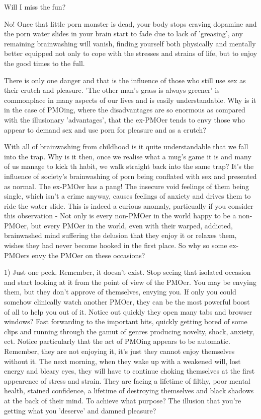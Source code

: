 Will I miss the fun?

No! Once that little porn monster is dead, your body stops craving dopamine and the porn water slides in your brain start to fade due to lack of 'greasing', any remaining brainwashing will vanish, finding yourself both physically and mentally better equipped not only to cope with the stresses and strains of life, but to enjoy the good times to the full.

There is only one danger and that is the influence of those who still use sex as their crutch and pleasure. 'The other man's grass is always greener' is commonplace in many aspects of our lives and is easily understandable. Why is it in the case of PMOing, where the disadvantages are so enormous as compared with the illusionary 'advantages', that the ex-PMOer tends to envy those who appear to demand sex and use porn for pleasure and as a crutch?

With all of brainwashing from childhood is it quite understandable that we fall into the trap. Why is it then, once we realise what a mug's game it is and many of us manage to kick th habit, we walk straight back into the same trap? It's the influence of society's brainwashing of porn being conflated with sex and presented as normal. The ex-PMOer has a pang! The insecure void feelings of them being single, which isn't a crime anyway, causes feelings of anxiety and drives them to ride the water slide. This is indeed a curious anomaly, particually if you consider this observation - Not only is every non-PMOer in the world happy to be a non-PMOer, but every PMOer in the world, even with their warped, addicted, brainwashed mind suffering the delusion that they enjoy it or relaxes them, wishes they had never become hooked in the first place. So why so some ex-PMOers envy the PMOer on these occasions?

  1) Just one peek. Remember, it doesn't exist. Stop seeing that isolated occasion and start looking at it from the point of view of the PMOer. You may be envying them, but they don't approve of themselves, envying you. If only you could somehow clinically watch another PMOer, they can be the most powerful boost of all to help you out of it. Notice out quickly they open many tabs and browser windows? Fast forwarding to the important bits, quickly getting bored of some clips and running through the gamut of genres producing novelty, shock, anxiety, ect. Notice particularly that the act of PMOing appears to be automatic. Remember, they are not enjoying it, it's just they cannot enjoy themselves without it. The next morning, when they wake up with a weakened will, lost energy and bleary eyes, they will have to continue choking themselves at the first appearence of stress and strain. They are facing a lifetime of filthy, poor mental health, stained confidence, a lifetime of destroying themselves and black shadows at the back of their mind. To achieve what purpose? The illusion that you're getting what you 'deserve' and damned pleasure?

